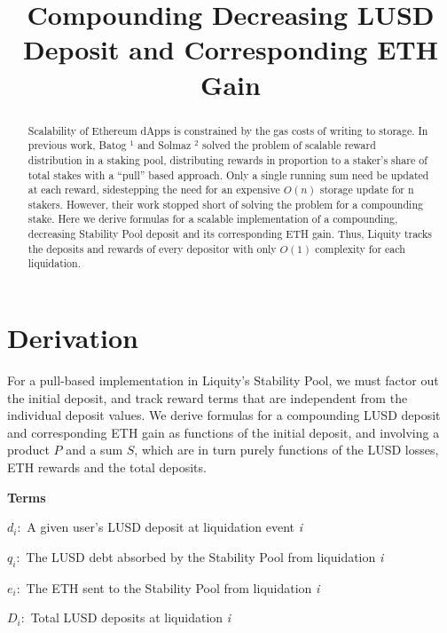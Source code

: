 \documentclass[reqno]{article}
\begin{document}
\title{\textbf{Compounding Decreasing LUSD Deposit and Corresponding ETH Gain}}
\date{} %
\maketitle
\begin{abstract}
    Scalability of Ethereum dApps is constrained by the gas costs of writing to storage. 
    In previous work, Batog $^{1}$ and Solmaz $^{2}$ solved the problem of scalable reward distribution in a staking pool, distributing rewards in proportion to a staker’s share of total stakes with a “pull” based approach. Only a single running sum need be updated at each reward, sidestepping the need for an expensive $O(n)$ storage update for n stakers. However, their work stopped short of solving the problem for a compounding stake.
    Here we derive formulas for a scalable implementation of a compounding, decreasing Stability Pool deposit and its corresponding ETH gain. Thus, Liquity tracks the deposits and rewards of every depositor with only $O(1)$ complexity for each liquidation.
\end{abstract}

\section{Derivation}
For a pull-based implementation in Liquity’s Stability Pool, we must factor out the initial deposit, and track reward terms that are independent from the individual deposit values. We derive formulas for a compounding LUSD deposit and corresponding ETH gain as functions of the initial deposit, and involving a product $P$ and a sum $S$, which are in turn purely functions of the LUSD losses, ETH rewards and the total deposits.

\bigskip
\raggedright %

\textbf{Terms}
\begin{terms}
    \item $d_i:$ A given user’s LUSD deposit at liquidation event \textit{i}\\
    \item $q_i:$ The LUSD debt absorbed by the Stability Pool from liquidation \textit{i}\\
    \item $e_i:$ The ETH sent to the Stability Pool from liquidation \textit{i}\\
    \item $D_i:$ Total LUSD deposits at liquidation \textit{i}
\end{terms}
\end{document}
